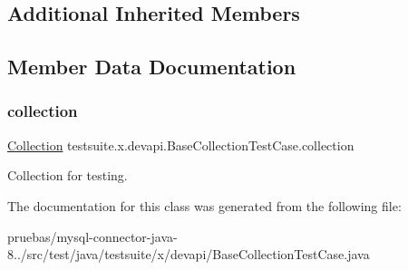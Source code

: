 \subsection*{Additional Inherited Members}


\subsection{Member Data Documentation}
\mbox{\label{classtestsuite_1_1x_1_1devapi_1_1_base_collection_test_case_afab9f41edef1f1ad90584af214cf1066}} 
\subsubsection{\texorpdfstring{collection}{collection}}
{\footnotesize\ttfamily \mbox{\hyperlink{interfacecom_1_1mysql_1_1cj_1_1xdevapi_1_1_collection}{Collection}} testsuite.\+x.\+devapi.\+Base\+Collection\+Test\+Case.\+collection\hspace{0.3cm}{\ttfamily [protected]}}

Collection for testing. 

The documentation for this class was generated from the following file\+:\begin{DoxyCompactItemize}
\item 
pruebas/mysql-\/connector-\/java-\/8../src/test/java/testsuite/x/devapi/Base\+Collection\+Test\+Case.\+java\end{DoxyCompactItemize}
